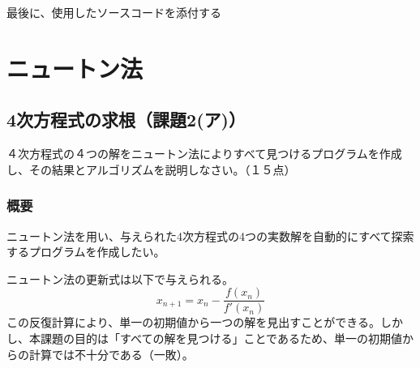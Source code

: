 \documentclass[dvipdfmx,a4paper]{jsarticle}
\begin{document}
最後に、使用したソースコードを添付する


\section{ニュートン法}

\subsection{4次方程式の求根（課題2(ア)）}
４次方程式の４つの解をニュートン法によりすべて見つけるプログラムを作成し、その結果とアルゴリズムを説明しなさい。（１５点）
\subsubsection{概要}
ニュートン法を用い、与えられた4次方程式の4つの実数解を自動的にすべて探索するプログラムを作成したい。

ニュートン法の更新式は以下で与えられる。
$$
x_{n+1} = x_n - \frac{f(x_n)}{f'(x_n)}
$$
この反復計算により、単一の初期値から一つの解を見出すことができる。しかし、本課題の目的は「すべての解を見つける」ことであるため、単一の初期値からの計算では不十分である（一敗）。
\end{document}
